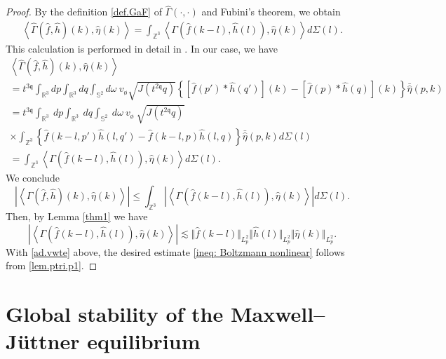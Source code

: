 \documentclass[reqno]{amsart}
\newcommand{\pv}{p}
\newcommand{\qv}{q}
\def\norm#1{\big\Vert#1\big\Vert}
\newcommand{\irnp}[2]{\left\langle {#1},{#2} \right\rangle}
\newcommand{\qq}{\mathfrak{q}}
\newcommand{\tqq}{t^{2\qq}}
\newcommand{\Emptyset}{\text{\o}}
\newcommand{\Ga}{\Gamma}
\newcommand{\Z}{\mathbb{Z}}
\theoremstyle{definition}
\numberwithin{equation}{section}
\numberwithin{theorem}{section}
\begin{document}
\begin{proof}
By the definition \eqref{def.GaF} of $\hat{\Ga} (\cdot,\cdot)$ and Fubini's theorem, we obtain
\begin{align}\label{fourier.convolution.nonlin}
\irnp{\hat{\Gamma}(\hat{f},\hat{h})(k)}{\hat{\eta}(k)}
=
\int_{\Z^3} \irnp{ \Gamma(\hat{f}(k-l),\hat{h}(l))}{\hat{\eta}(k)}  d\Sigma(l).
\end{align}
This calculation is performed in detail in \cite[Lemma 3.2]{1904.12086}.  In our case, we have
\begin{multline*}
    \irnp{\hat{\Gamma}(\hat{f},\hat{h})(k)}{\hat{\eta}(k)}
\\
=
t^{3\qq}\int_{\mathbb{R}^3}   d\pv \int_{\mathbb{R}^3}   dq 
\int_{\mathbb{S}^{2}}  d\omega
~ v_{\Emptyset}  
 \sqrt{J(\tqq\qv)}
\left\{[\hat{f}(\pv')*\hat{h}(\qv')](k)-[\hat{f}(\pv)*\hat{h}(\qv)](k)\right\}\bar{\hat{\eta}}(\pv,k) 
\\
=
t^{3\qq}\int_{\mathbb{R}^3} ~  d\pv \int_{\mathbb{R}^3} ~  dq 
\int_{\mathbb{S}^{2}} ~ d\omega
~ v_{\Emptyset} ~  
 \sqrt{J(\tqq\qv)}
\\
\times\int_{\Z^3} \left\{\hat{f}(k-l,\pv')\hat{h}(l,\qv')-\hat{f}(k-l,\pv)\hat{h}(l,\qv)\right\} \bar{\hat{\eta}}(\pv,k) d\Sigma(l) 
\\
=
\int_{\Z^3} \irnp{\Gamma(\hat{f}(k-l),\hat{h}(l))}{\hat{\eta}(k)}  d\Sigma(l).
\end{multline*}
We conclude
\begin{equation}
\label{lem.ptri.p1}
\left\vert \irnp{\hat{\Gamma}(\hat{f},\hat{h})(k)}{\hat{\eta}(k)}\right\vert\le \int_{\Z^3} \left\vert \irnp{\Gamma(\hat{f}(k-l),\hat{h}(l))}{\hat{\eta}(k)}\right\vert d\Sigma(l).
\end{equation}
Then, by Lemma \ref{thm1} we have 
\begin{equation}\label{ad.vwte}
\left|\irnp{\Gamma(\hat{f}(k-l),\hat{h}(l))}{\hat{\eta}(k)} \right| 
\lesssim \Vert \hat{f}(k-l)\Vert_{L^2_{\pv}} \norm{\hat{h}(l)}_{L^2_{\pv}}  \norm{\hat{\eta}(k)}_{L^2_{\pv}}.
\end{equation}
With \eqref{ad.vwte} above, the desired estimate \eqref{ineq: Boltzmann nonlinear} follows from \eqref{lem.ptri.p1}.  \end{proof}







\section{ Global stability of the Maxwell--J\"uttner equilibrium}\label{sectproofsmainresults}
\end{document}
